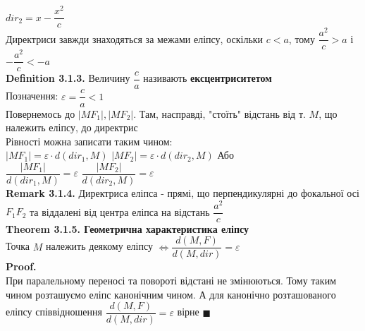 \documentclass[a4paper, 14pt]{extarticle}
\def\defin#1{\textbf{Definition {#1}}}
\def\rm#1{\textbf{Remark {#1}}}
\def\th#1{\textbf{Theorem {#1}}}
\def\proof{\textbf{Proof.}\\}
\def\bigline{\vspace{5mm}\\}
\def\qed{$\blacksquare$}
\begin{document}
$dir_2 = x - \dfrac{x^2}{c}$
\bigline
Директриси завжди знаходяться за межами еліпсу, оскільки $c < a$, тому $\dfrac{a^2}{c} > a$ і $-\dfrac{a^2}{c} < -a$
\bigline
\defin{3.1.3.} Величину $\dfrac{c}{a}$ називають \textbf{ексцентриситетом}\\
Позначення: $\varepsilon = \dfrac{c}{a} < 1$ \bigline
Повернемось до $|MF_1|,|MF_2|$. Там, насправді, "стоїть" \textrm{} відстань від т. $M$, що належить еліпсу, до директрис\\
Рівності можна записати таким чином:\\
$|MF_1| = \varepsilon \cdot d(dir_1, M)$ \hspace{0.5cm} $|MF_2| = \varepsilon \cdot d(dir_2, M)$
Або\\
$\dfrac{|MF_1|}{d(dir_1, M)} = \varepsilon$ \hspace{0.5cm} $\dfrac{|MF_2|}{d(dir_2, M)} = \varepsilon$
\bigline
\rm{3.1.4.} Директриса еліпса - прямі, що перпендикулярні до фокальної осі $F_1F_2$ та віддалені від центра еліпса на відстань $\dfrac{a^2}{c}$
\bigline
\th{3.1.5. Геометрична характеристика еліпсу}\\
Точка $M$ належить деякому еліпсу $\iff \dfrac{d(M,F)}{d(M,dir)} = \varepsilon$\\
\proof
При паралельному переносі та повороті відстані не змінюються. Тому таким чином розташуємо еліпс канонічним чином. А для канонічно розташованого еліпсу співвідношення $\dfrac{d(M,F)}{d(M,dir)} = \varepsilon$ вірне \qed
\bigline
\end{document}
